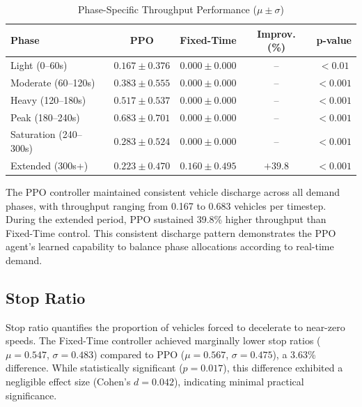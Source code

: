 \documentclass[11pt, a4paper]{report}
\begin{document}
\begin{table}[htbp]
\centering
\caption{Phase-Specific Throughput Performance ($\mu \pm \sigma$)}
\label{tab:throughput_phases}
\begin{tabular}{lcccc}
\toprule
\textbf{Phase} & \textbf{PPO} & \textbf{Fixed-Time} & \textbf{Improv. (\%)} & \textbf{p-value} \\
\midrule
Light (0--60s) & $0.167 \pm 0.376$ & $0.000 \pm 0.000$ & -- & $<0.01$ \\
Moderate (60--120s) & $0.383 \pm 0.555$ & $0.000 \pm 0.000$ & -- & $<0.001$ \\
Heavy (120--180s) & $0.517 \pm 0.537$ & $0.000 \pm 0.000$ & -- & $<0.001$ \\
Peak (180--240s) & $0.683 \pm 0.701$ & $0.000 \pm 0.000$ & -- & $<0.001$ \\
Saturation (240--300s) & $0.283 \pm 0.524$ & $0.000 \pm 0.000$ & -- & $<0.001$ \\
Extended (300s+) & $0.223 \pm 0.470$ & $0.160 \pm 0.495$ & $+39.8$ & $<0.001$ \\
\bottomrule
\end{tabular}
\end{table}

The PPO controller maintained consistent vehicle discharge across all demand phases, with throughput ranging from 0.167 to 0.683 vehicles per timestep. During the extended period, PPO sustained 39.8\% higher throughput than Fixed-Time control. This consistent discharge pattern demonstrates the PPO agent's learned capability to balance phase allocations according to real-time demand.

\subsection{Stop Ratio}

Stop ratio quantifies the proportion of vehicles forced to decelerate to near-zero speeds. The Fixed-Time controller achieved marginally lower stop ratios ($\mu = 0.547$, $\sigma = 0.483$) compared to PPO ($\mu = 0.567$, $\sigma = 0.475$), a 3.63\% difference. While statistically significant ($p = 0.017$), this difference exhibited a negligible effect size (Cohen's $d = 0.042$), indicating minimal practical significance.
\end{document}
